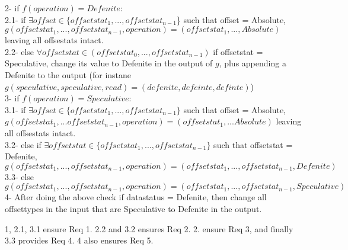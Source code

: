 \documentclass[a4paper, 11pt]{article}
\begin{document}
2- if $f(operation) = Defenite$:\\

\hspace{ 8mm}
	2.1- if $\exists offset \in \{offsetstat_1, ..., offsetstat_{n-1}$\} such that offset = Absolute,  $g(offsetstat_1, ..., offsetstat_{n-1}, operation) = (offsetstat_1, ... ,Absolute)$ leaving all offsestats intact.\\ 

\hspace{ 8mm}
	2.2- else $\forall offsetstat \in (offsetstat_0, ..., offsetstat_{n-1})$ if offsetstat = Speculative, change its value to Defenite in the output of $g$, plus appending a Defenite to the output (for instane $g(speculative, speculative, read) = (defenite, defeinte, definte)$)\\

3- if $f(operation) = Speculative$:\\

\hspace{ 8mm}
	3.1- if $\exists offset \in \{offsetstat_1, ..., offsetstat_{n-1}\}$ such that offset = Absolute, $g(offsetstat_1, ... offsetstat_{n-1}, operation) = (offsetstat_1, ... Absolute)$ leaving all offsestats intact.\\ 

\hspace{ 8mm}
	3.2- else if $\exists offsetstat \in \{offsetstat_1, ..., offsetstat_{n-1}\}$ such that offsetstat = {Defenite},  $g(offsetstat_1, ...,  offsetstat_{n-1}, operation) = (offsetstat_1 ,..., offsetstat_{n-1}, Defenite)$\\

\hspace{ 8mm}
	3.3- else $g(offsetstat_1, ..., offsetstat_{n-1}, operation) = (offsetstat_1, ..., offsetstat_{n-1}, Speculative)$\\

4- After doing the above check if datastatus = Defenite, then change all offsettypes in the input that are Speculative to Defenite in the output.

1, 2.1, 3.1 ensure Req 1. 2.2 and 3.2 ensures Req 2. 2. ensure Req 3, and finally 3.3 provides Req 4. 4 also ensures Req 5. 








\end{document}
